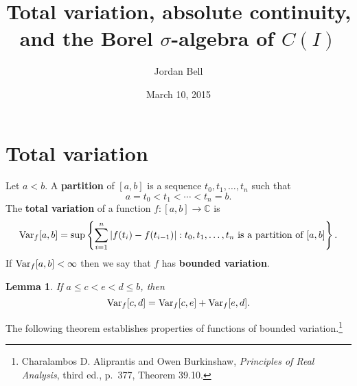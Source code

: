 \documentclass{article}
\newcommand{\Var}{\ensuremath\mathrm{Var}}
\newtheorem{lemma}[theorem]{Lemma}
\theoremstyle{definition}
\begin{document}
\title{Total variation, absolute continuity, and the Borel $\sigma$-algebra of $C(I)$}
\author{Jordan Bell}
\date{March 10, 2015}

\maketitle

\section{Total variation}
Let $a < b$.
A \textbf{partition} of $[a,b]$ is a sequence $t_0,t_1,\ldots,t_n$ such that
\[
a=t_0 <  t_1 < \cdots < t_n = b.
\]
The \textbf{total variation} of a function $f:[a,b] \to \mathbb{C}$ is
\[
\Var_f[a,b] = \sup\left\{ \sum_{i=1}^n |f(t_i)-f(t_{i-1})|: \textrm{$t_0,t_1,\ldots,t_n$ is a partition of $[a,b]$}\right\}.
\]
If $\Var_f[a,b]<\infty$ then we say that $f$ has \textbf{bounded variation}.


\begin{lemma}
If $a \leq c < e < d \leq b$, then
\[
\Var_f[c,d] = \Var_f[c,e]+\Var_f[e,d].
\]
\end{lemma}

The following theorem establishes properties of functions of bounded variation.\footnote{Charalambos D. Aliprantis and Owen Burkinshaw, {\em Principles of Real Analysis}, third ed.,
p.~377, Theorem 39.10.}
\end{document}
